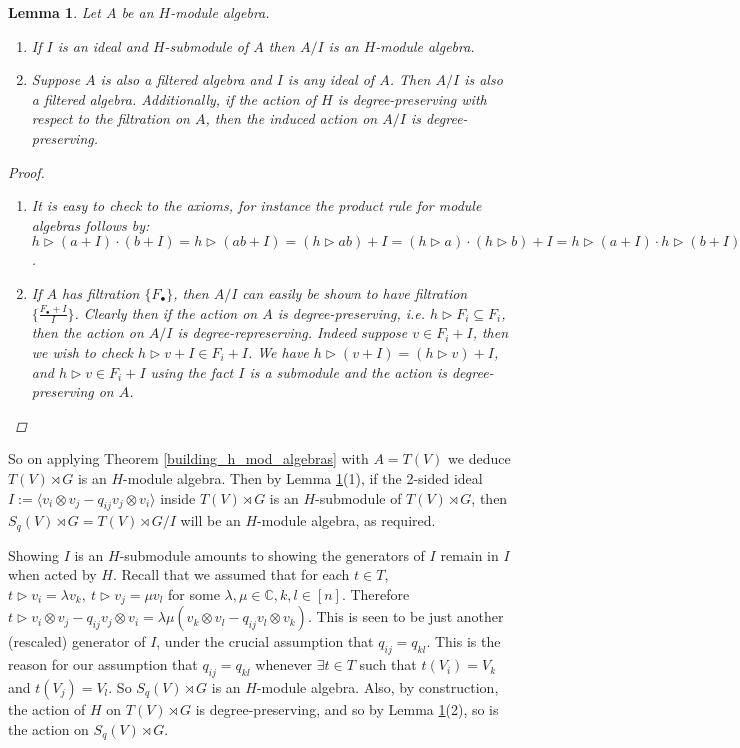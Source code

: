\documentclass[10pt]{article}
\newcommand{\bb}{\medbreak}
\newcommand{\nt}{\noindent}
\newcommand{\Cc }{\mathbb{C}}
\newcommand{\cd}{\cdot}
\newtheorem{lemma}{Lemma}[section]
\theoremstyle{definition}
\begin{document}
\begin{lemma}\label{quotients_h_mod_algs_result} Let $A$ be an $H$-module algebra. 
\begin{enumerate}
  \item If $I$ is an ideal and $H$-submodule of $A$ then $A/I$ is an $H$-module algebra. 
  \item Suppose $A$ is also a filtered algebra and $I$ is any ideal of $A$. Then $A/I$ is also a filtered algebra. Additionally, if the action of $H$ is degree-preserving with respect to the filtration on $A$, then the induced action on $A/I$ is degree-preserving.
\end{enumerate}
\begin{proof}
\begin{enumerate}
  \item It is easy to check to the axioms, for instance the product rule for module algebras follows by: $h\rhd (a+I)\cd (b+I)=h\rhd (ab+I)=(h\rhd ab)+I=(h\rhd a)\cd (h\rhd b)+I=h\rhd (a+I)\cd h\rhd (b+I)$.%
  \item  If $A$ has filtration $\{F_\bullet\}$, then $A/I$ can easily be shown to have filtration $\{\frac{F_\bullet +I}{I}\}$. Clearly then if the action on $A$ is degree-preserving, i.e. $h\rhd F_i\subseteq F_i$, then the action on $A/I$ is degree-represerving. Indeed suppose $v\in F_i+I$, then we wish to check $h\rhd v+I\in F_i+I$. We have $h\rhd (v+I)=(h\rhd v)+I$, and $h\rhd v\in F_i+I$ using the fact $I$ is a submodule and the action is degree-preserving on $A$.
\end{enumerate}
\end{proof}
\end{lemma}

\nt So on applying Theorem \ref{building_h_mod_algebras} with $A=T(V)$ we deduce $T(V)\rtimes G$ is an $H$-module algebra. Then by Lemma \ref{quotients_h_mod_algs_result}(1), if the 2-sided ideal $I:=\langle  v_i\otimes v_j-q_{ij}v_j\otimes v_i\rangle$ inside $T(V)\rtimes G$ is an $H$-submodule of $T(V)\rtimes G$, then $S_q(V)\rtimes G=T(V)\rtimes G/I$ will be an $H$-module algebra, as required.\bb

\nt Showing $I$ is an $H$-submodule amounts to showing the generators of $I$ remain in $I$ when acted by $H$. Recall that we assumed that for each $t\in T$, $t\rhd v_i=\lambda v_k,\ t\rhd v_j=\mu v_l$ for some $\lambda,\mu\in \Cc , k,l\in [n]$. Therefore $t\rhd  v_i\otimes v_j-q_{ij}v_j\otimes v_i=\lambda\mu (v_k\otimes v_l-q_{ij}v_l\otimes v_k)$. This is seen to be just another (rescaled) generator of $I$, under the crucial assumption that $q_{ij}=q_{kl}$. This is the reason for our assumption that $q_{ij}=q_{kl}$ whenever $\exists t\in T$ such that $t(V_i)=V_k$ and $t(V_j)=V_l$. So $S_q(V)\rtimes G$ is an $H$-module algebra. Also, by construction, the action of $H$ on $T(V)\rtimes G$ is degree-preserving, and so by Lemma \ref{quotients_h_mod_algs_result}(2), so is the action on $S_q(V)\rtimes G$.
\end{document}
